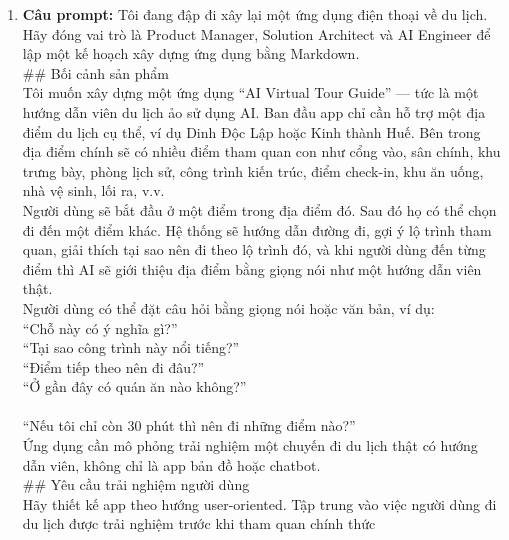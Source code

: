 \begin{enumerate}
\item \textbf{Câu prompt:} Tôi đang đập đi xây lại một ứng dụng điện thoại về du lịch. Hãy đóng vai trò là Product Manager, Solution Architect và AI Engineer để lập một kế hoạch xây dựng ứng dụng bằng Markdown. \\

\#\# Bối cảnh sản phẩm \\

Tôi muốn xây dựng một ứng dụng “AI Virtual Tour Guide” — tức là một hướng dẫn viên du lịch ảo sử dụng AI. Ban đầu app chỉ cần hỗ trợ một địa điểm du lịch cụ thể, ví dụ Dinh Độc Lập hoặc Kinh thành Huế. Bên trong địa điểm chính sẽ có nhiều điểm tham quan con như cổng vào, sân chính, khu trưng bày, phòng lịch sử, công trình kiến trúc, điểm check-in, khu ăn uống, nhà vệ sinh, lối ra, v.v. \\

Người dùng sẽ bắt đầu ở một điểm trong địa điểm đó. Sau đó họ có thể chọn đi đến một điểm khác. Hệ thống sẽ hướng dẫn đường đi, gợi ý lộ trình tham quan, giải thích tại sao nên đi theo lộ trình đó, và khi người dùng đến từng điểm thì AI sẽ giới thiệu địa điểm bằng giọng nói như một hướng dẫn viên thật. \\

Người dùng có thể đặt câu hỏi bằng giọng nói hoặc văn bản, ví dụ: \\
\* “Chỗ này có ý nghĩa gì?” \\
\* “Tại sao công trình này nổi tiếng?” \\
\* “Điểm tiếp theo nên đi đâu?” \\
\* “Ở gần đây có quán ăn nào không?” \\
\* \\
\* “Nếu tôi chỉ còn 30 phút thì nên đi những điểm nào?” \\


Ứng dụng cần mô phỏng trải nghiệm một chuyến đi du lịch thật có hướng dẫn viên, không chỉ là app bản đồ hoặc chatbot. \\

\#\# Yêu cầu trải nghiệm người dùng \\

Hãy thiết kế app theo hướng user-oriented. Tập trung vào việc người dùng đi du lịch được trải nghiệm trước khi tham quan chính thức \\


\end{enumerate}

